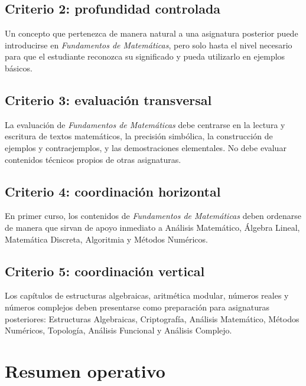 \subsection*{Criterio 2: profundidad controlada}

Un concepto que pertenezca de manera natural a una asignatura posterior puede introducirse en \emph{Fundamentos de Matemáticas}, pero solo hasta el nivel necesario para que el estudiante reconozca su significado y pueda utilizarlo en ejemplos básicos.

\subsection*{Criterio 3: evaluación transversal}

La evaluación de \emph{Fundamentos de Matemáticas} debe centrarse en la lectura y escritura de textos matemáticos, la precisión simbólica, la construcción de ejemplos y contraejemplos, y las demostraciones elementales. No debe evaluar contenidos técnicos propios de otras asignaturas.

\subsection*{Criterio 4: coordinación horizontal}

En primer curso, los contenidos de \emph{Fundamentos de Matemáticas} deben ordenarse de manera que sirvan de apoyo inmediato a Análisis Matemático, Álgebra Lineal, Matemática Discreta, Algoritmia y Métodos Numéricos.

\subsection*{Criterio 5: coordinación vertical}

Los capítulos de estructuras algebraicas, aritmética modular, números reales y números complejos deben presentarse como preparación para asignaturas posteriores: Estructuras Algebraicas, Criptografía, Análisis Matemático, Métodos Numéricos, Topología, Análisis Funcional y Análisis Complejo.

\section{Resumen operativo}

